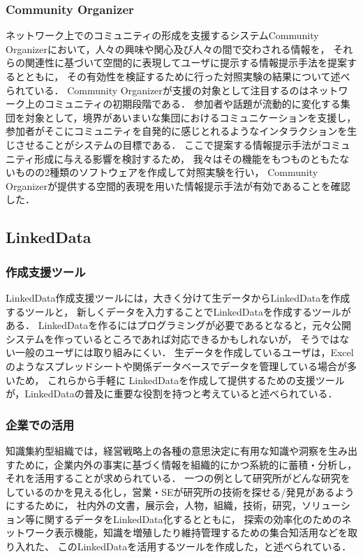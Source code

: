 \subsubsection{Community Organizer}
ネットワーク上でのコミュニティの形成を支援するシステムCommunity Organizer\cite{organizer}において，人々の興味や関心及び人々の間で交わされる情報を，
それらの関連性に基づいて空間的に表現してユーザに提示する情報提示手法を提案するとともに，
その有効性を検証するために行った対照実験の結果について述べられている．
Community Organizerが支援の対象として注目するのはネットワーク上のコミュニティの初期段階である．
参加者や話題が流動的に変化する集団を対象として，境界があいまいな集団におけるコミュニケーションを支援し，
参加者がそこにコミュニティを自発的に感じとれるようなインタラクションを生じさせることがシステムの目標である．
ここで提案する情報提示手法がコミュニティ形成に与える影響を検討するため，
我々はその機能をもつものともたないものの2種類のソフトウェアを作成して対照実験を行い，
Community Organizerが提供する空間的表現を用いた情報提示手法が有効であることを確認した．

\subsection{LinkedData}

\subsubsection{作成支援ツール}
LinkedData作成支援ツールには，大きく分けて生データからLinkedDataを作成するツールと，
新しくデータを入力することでLinkedDataを作成するツールがある\cite{tool}．
LinkedDataを作るにはプログラミングが必要であるとなると，元々公開システムを作っているところであれば対応できるかもしれないが，
そうではない一般のユーザには取り組みにくい．
生データを作成しているユーザは，Excelのようなスプレッドシートや関係データベースでデータを管理している場合が多いため，
これらから手軽に LinkedDataを作成して提供するための支援ツールが，LinkedDataの普及に重要な役割を持つと考えていると述べられている．

\subsubsection{企業での活用}
知識集約型組織では，経営戦略上の各種の意思決定に有用な知識や洞察を生み出すために，企業内外の事実に基づく情報を組織的にかつ系統的に蓄積・分析し，それを活用することが求められている．
一つの例として研究所がどんな研究をしているのかを見える化し，営業・SEが研究所の技術を探せる/発見があるようにするために，
社内外の文書，展示会，人物，組織，技術，研究，ソリューション等に関するデータをLinkedData化するとともに，
探索の効率化のためのネットワーク表示機能，知識を増殖したり維持管理するための集合知活用などを取り入れた、
このLinkedDataを活用するツールを作成した\cite{company}，と述べられている．

